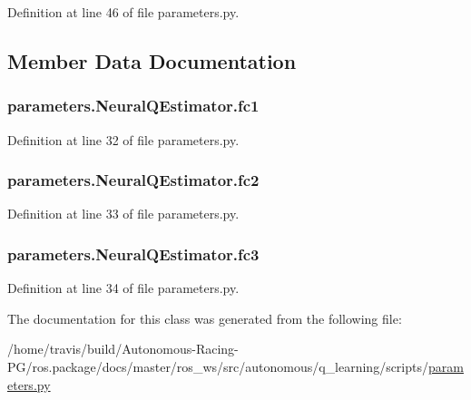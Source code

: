 Definition at line 46 of file parameters.\+py.



\subsection{Member Data Documentation}
\subsubsection[{\texorpdfstring{fc1}{fc1}}]{\setlength{\rightskip}{0pt plus 5cm}parameters.\+Neural\+Q\+Estimator.\+fc1}\hypertarget{classparameters_1_1_neural_q_estimator_ab0fb7d0e286565a2531f3ddb126e2592}{}\label{classparameters_1_1_neural_q_estimator_ab0fb7d0e286565a2531f3ddb126e2592}


Definition at line 32 of file parameters.\+py.

\subsubsection[{\texorpdfstring{fc2}{fc2}}]{\setlength{\rightskip}{0pt plus 5cm}parameters.\+Neural\+Q\+Estimator.\+fc2}\hypertarget{classparameters_1_1_neural_q_estimator_abd606711b39f423590adacb37c5b55d0}{}\label{classparameters_1_1_neural_q_estimator_abd606711b39f423590adacb37c5b55d0}


Definition at line 33 of file parameters.\+py.

\subsubsection[{\texorpdfstring{fc3}{fc3}}]{\setlength{\rightskip}{0pt plus 5cm}parameters.\+Neural\+Q\+Estimator.\+fc3}\hypertarget{classparameters_1_1_neural_q_estimator_ac48aa201a71a0e25e8ca7274a2cc5733}{}\label{classparameters_1_1_neural_q_estimator_ac48aa201a71a0e25e8ca7274a2cc5733}


Definition at line 34 of file parameters.\+py.



The documentation for this class was generated from the following file\+:\begin{DoxyCompactItemize}
\item 
/home/travis/build/\+Autonomous-\/\+Racing-\/\+P\+G/ros.\+package/docs/master/ros\+\_\+ws/src/autonomous/q\+\_\+learning/scripts/\hyperlink{parameters_8py}{parameters.\+py}\end{DoxyCompactItemize}
